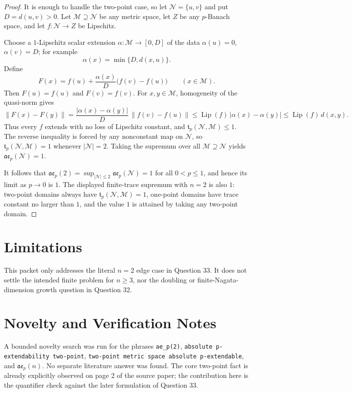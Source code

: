 \documentclass[11pt]{article}
\newcommand{\M}{\mathcal M}
\newcommand{\N}{\mathcal N}
\newcommand{\Lip}{\operatorname{Lip}}
\newcommand{\aep}{\mathfrak{ae}_p}
\newcommand{\tp}{\mathfrak t_p}
\begin{document}
\begin{proof}
It is enough to handle the two-point case, so let \(\N=\{u,v\}\) and put
\(D=d(u,v)>0\).  Let \(\M\supseteq\N\) be any metric space, let \(Z\) be any
\(p\)-Banach space, and let \(f:\N\to Z\) be Lipschitz.

Choose a \(1\)-Lipschitz scalar extension
\(\alpha:\M\to[0,D]\) of the data \(\alpha(u)=0\), \(\alpha(v)=D\); for
example
\[
  \alpha(x)=\min\{D,d(x,u)\}.
\]
Define
\[
  F(x)=f(u)+\frac{\alpha(x)}{D}\bigl(f(v)-f(u)\bigr)\qquad (x\in\M).
\]
Then \(F(u)=f(u)\) and \(F(v)=f(v)\).  For \(x,y\in\M\), homogeneity of the
quasi-norm gives
\[
\|F(x)-F(y)\|
 =\frac{|\alpha(x)-\alpha(y)|}{D}\,\|f(v)-f(u)\|
 \le \Lip(f)\,|\alpha(x)-\alpha(y)|
 \le \Lip(f)\,d(x,y).
\]
Thus every \(f\) extends with no loss of Lipschitz constant, and
\(\tp(\N,\M)\le1\).  The reverse inequality is forced by any nonconstant map
on \(\N\), so \(\tp(\N,\M)=1\) whenever \(|\N|=2\).  Taking the supremum over
all \(\M\supseteq\N\) yields \(\aep(\N)=1\).

It follows that \(\mathfrak{ae}_p(2)=\sup_{|\N|\le2}\aep(\N)=1\) for all
\(0<p\le1\), and hence its limit as \(p\to0\) is \(1\).  The displayed
finite-trace supremum with \(n=2\) is also \(1\): two-point domains always
have \(\tp(\N,\M)=1\), one-point domains have trace constant no larger than
\(1\), and the value \(1\) is attained by taking any two-point domain.
\end{proof}

\section*{Limitations}

This packet only addresses the literal \(n=2\) edge case in Question 33.  It
does not settle the intended finite problem for \(n\ge3\), nor the doubling or
finite-Nagata-dimension growth question in Question 32.

\section*{Novelty and Verification Notes}

A bounded novelty search was run for the phrases \texttt{ae\_p(2)},
\texttt{absolute p-extendability two-point}, \texttt{two-point metric space
absolute p-extendable}, and \(\mathfrak{ae}_p(n)\).  No separate literature
answer was found.  The core two-point fact is already explicitly observed on
page 2 of the source paper; the contribution here is the quantifier check
against the later formulation of Question 33.
\end{document}
